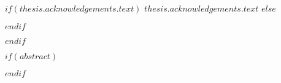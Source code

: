 \begin{acknowledgements}
\begin{singlespace}

\setlength\parindent{0pt}

$if(thesis.acknowledgements.text)$
$thesis.acknowledgements.text$
$else$

$endif$
\end{singlespace}
\end{acknowledgements}

$endif$

$if(abstract)$

\begin{abstract}
\begin{singlespace}

\setlength\parindent{0pt}

{$abstract$}\vspace{0.3cm}

{Palabras clave: }{\keywordnames}%
\end{singlespace}
\end{abstract}

$endif$




% 
\renewcommand{\contentsname}{Índice de Contenidos}
\tableofcontents %

\renewcommand{\listfigurename}{Índice de Figuras}
\listoffigures %

% 

